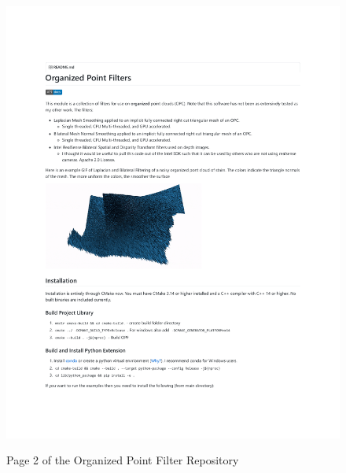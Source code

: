 \begin{figure}[h!]
    \centering\includegraphics[page=2, trim=1.0in 1.0in 1.0in 1.0in, width=.93\linewidth]{appendix_1/imgs/OPFReadme.pdf}
    \label{fig:apx1_opc2}
    \caption{Page 2 of the Organized Point Filter Repository} 
\end{figure}



% 
% 



